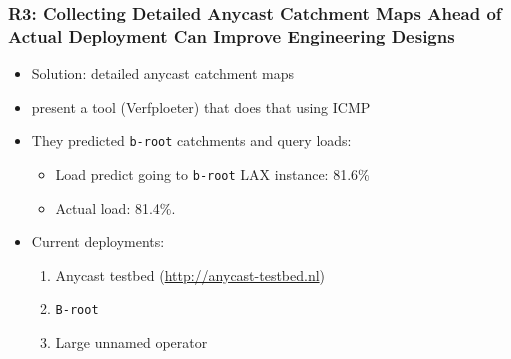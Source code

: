 \documentclass[11pt,show 
notes,notheorems,noamsthm,blank]{beamer} %
\begin{document}
\begin{frame}
 \frametitle{R3: Collecting Detailed Anycast Catchment Maps Ahead of Actual
    Deployment Can Improve Engineering Designs}
    
\begin{itemize}
 \item Solution: detailed anycast catchment maps
 \item \cite{Vries17b} present a tool (Verfploeter) that does that using ICMP
 \item They predicted \texttt{b-root} catchments and  query loads:
 \begin{itemize}
  \item  Load predict going to \texttt{b-root} LAX instance: 81.6\% 
  \item Actual load: 81.4\%.
 \end{itemize}

\item Current deployments:

\begin{enumerate}
 \item Anycast testbed (\url{http://anycast-testbed.nl})
 \item \texttt{B-root}
 \item Large unnamed operator
\end{enumerate}
% 
%  
\end{itemize}


    
\end{frame}
\end{document}
